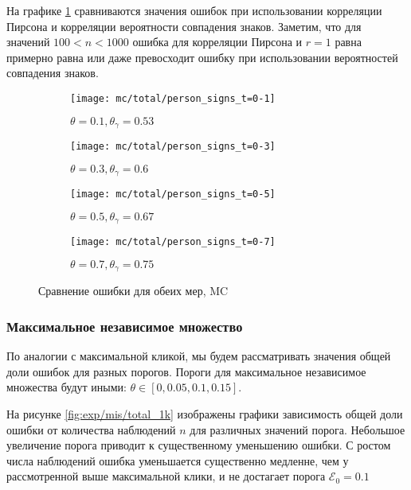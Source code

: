 На графике \ref{fig:exp/mc/pearson_signs} сравниваются значения ошибок при использовании корреляции Пирсона и корреляции вероятности совпадения знаков. Заметим, что для значений $100<n<1000$ ошибка для корреляции Пирсона и $r=1$ равна примерно равна или даже превосходит ошибку при использовании вероятностей совпадения знаков. 


\begin{figure}[H]
     \centering
     \begin{subfigure}[b]{0.49\textwidth}
         \centering
         \texttt{[image: mc/total/person\_signs\_t=0-1]}
         \caption{$\theta=0.1, \theta_\gamma=0.53$}
     \end{subfigure}
     \hfill
     \begin{subfigure}[b]{0.49\textwidth}
         \centering
         \texttt{[image: mc/total/person\_signs\_t=0-3]}
         \caption{$\theta=0.3, \theta_\gamma=0.6$}
     \end{subfigure}
     \vfill
     \begin{subfigure}[b]{0.49\textwidth}
         \centering
         \texttt{[image: mc/total/person\_signs\_t=0-5]}
         \caption{$\theta=0.5, \theta_\gamma=0.67$}
     \end{subfigure}
     \hfill
     \begin{subfigure}[b]{0.49\textwidth}
         \centering
         \texttt{[image: mc/total/person\_signs\_t=0-7]}
         \caption{$\theta=0.7,\theta_\gamma=0.75$}
     \end{subfigure}

        \caption{Сравнение ошибки для обеих мер, MC}
        \label{fig:exp/mc/pearson_signs}
\end{figure}  


\subsubsection{Максимальное независимое множество}

По аналогии с максимальной кликой, мы будем рассматривать значения общей доли ошибок для разных порогов. Пороги для максимальное независимое множества будут иными: $\theta \in [0, 0.05, 0.1, 0.15]$. 

На рисунке \ref{fig:exp/mis/total_1k} изображены графики зависимость общей доли ошибки от количества наблюдений $n$ для различных значений порога. Небольшое увеличение порога приводит к существенному уменьшению ошибки.  С ростом числа наблюдений ошибка уменьшается существенно медленне, чем у рассмотренной выше максимальной клики, и не достагает порога $\mathcal{E}_0=0.1$

